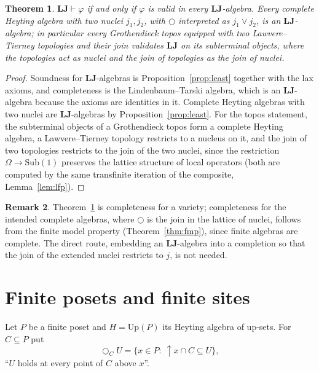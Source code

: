 \documentclass[11pt]{amsart}
\newtheorem{thm}{Theorem}[section]
\theoremstyle{definition}
\newtheorem{rem}[thm]{Remark}
\newcommand{\Up}{\mathrm{Up}}
\newcommand{\LLJ}{\mathbf{LJ}}
\newcommand{\lax}{\bigcirc}
\begin{document}
\begin{thm}\label{thm:complete}
$\LLJ\vdash\varphi$ if and only if $\varphi$ is valid in every $\LLJ$-algebra.
Every complete Heyting algebra with two nuclei $j_1,j_2$, with $\lax$
interpreted as $j_1\vee j_2$, is an $\LLJ$-algebra; in particular every
Grothendieck topos equipped with two Lawvere--Tierney topologies and their join
validates $\LLJ$ on its subterminal objects, where the topologies act as nuclei
and the join of topologies as the join of nuclei.
\end{thm}
\begin{proof}
Soundness for $\LLJ$-algebras is Proposition~\ref{prop:least} together with
the lax axioms, and completeness is the Lindenbaum--Tarski algebra, which is an
$\LLJ$-algebra because the axioms are identities in it. Complete Heyting
algebras with two nuclei are $\LLJ$-algebras by Proposition~\ref{prop:least}.
For the topos statement, the subterminal objects of a Grothendieck topos form a
complete Heyting algebra, a Lawvere--Tierney topology restricts to a nucleus on
it, and the join of two topologies restricts to the join of the two nuclei,
since the restriction $\Omega\to\mathrm{Sub}(1)$ preserves the lattice
structure of local operators (both are computed by the same transfinite
iteration of the composite, Lemma~\ref{lem:lfp}).
\end{proof}

\begin{rem}\label{rem:frames}
Theorem~\ref{thm:complete} is completeness for a variety; completeness for the
intended complete algebras, where $\lax$ is the join in the lattice of nuclei,
follows from the finite model property (Theorem~\ref{thm:fmp}), since finite
algebras are complete. The direct route, embedding an $\LLJ$-algebra into a
completion so that the join of the extended nuclei restricts to $j$, is not
needed.
\end{rem}

\section{Finite posets and finite sites}\label{sec:poset}

Let $P$ be a finite poset and $H=\Up(P)$ its Heyting algebra of up-sets. For
$C\subseteq P$ put
\[
\lax_C U=\{x\in P:\ \uparrow\!x\cap C\subseteq U\},
\]
``$U$ holds at every point of $C$ above $x$''.
\end{document}
